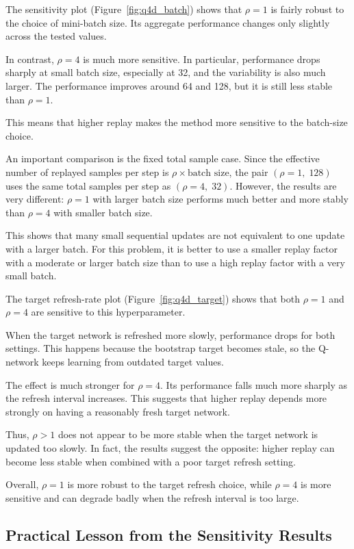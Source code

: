\documentclass[11pt,a4paper]{article}
\begin{document}
The sensitivity plot (Figure~\ref{fig:q4d_batch}) shows that \(\rho=1\) is fairly robust to the choice of mini-batch size. Its aggregate performance changes only slightly across the tested values.

In contrast, \(\rho=4\) is much more sensitive. In particular, performance drops sharply at small batch size, especially at 32, and the variability is also much larger. The performance improves around 64 and 128, but it is still less stable than \(\rho=1\).

This means that higher replay makes the method more sensitive to the batch-size choice.

An important comparison is the fixed total sample case. Since the effective number of replayed samples per step is \(\rho \times \text{batch size}\), the pair \((\rho=1,\;128)\) uses the same total samples per step as \((\rho=4,\;32)\). However, the results are very different: \(\rho=1\) with larger batch size performs much better and more stably than \(\rho=4\) with smaller batch size.

This shows that many small sequential updates are not equivalent to one update with a larger batch. For this problem, it is better to use a smaller replay factor with a moderate or larger batch size than to use a high replay factor with a very small batch.

The target refresh-rate plot (Figure~\ref{fig:q4d_target}) shows that both \(\rho=1\) and \(\rho=4\) are sensitive to this hyperparameter.

When the target network is refreshed more slowly, performance drops for both settings. This happens because the bootstrap target becomes stale, so the Q-network keeps learning from outdated target values.

The effect is much stronger for \(\rho=4\). Its performance falls much more sharply as the refresh interval increases. This suggests that higher replay depends more strongly on having a reasonably fresh target network.

Thus, \(\rho>1\) does not appear to be more stable when the target network is updated too slowly. In fact, the results suggest the opposite: higher replay can become less stable when combined with a poor target refresh setting.

Overall, \(\rho=1\) is more robust to the target refresh choice, while \(\rho=4\) is more sensitive and can degrade badly when the refresh interval is too large.

\subsection*{Practical Lesson from the Sensitivity Results}
\end{document}
